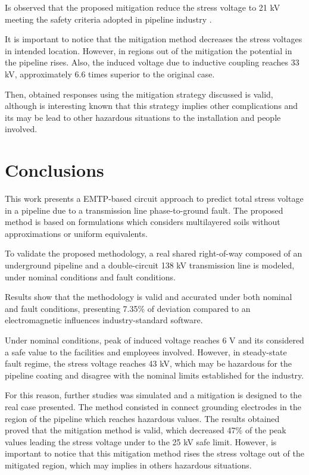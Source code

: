 \documentclass{IEEEtran4PSCC}
\begin{document}
Is observed that the proposed mitigation reduce the stress voltage to 21 kV meeting the safety criteria adopted in pipeline industry \cite{NACEInternational2007}. 

It is important to notice that the mitigation method decreases the stress voltages in intended location. However, in regions out of the mitigation the potential in the pipeline rises. Also, the induced voltage due to inductive coupling reaches 33 kV, approximately 6.6 times superior to the original case.

Then, obtained responses using the mitigation strategy discussed is valid, although is interesting known that this strategy implies other complications and its may be lead to other hazardous situations to the installation and people involved.

\section{Conclusions}

This work presents a EMTP-based circuit approach to predict total stress voltage in a pipeline due to a transmission line phase-to-ground fault. The proposed method is based on formulations which considers multilayered soils without approximations or uniform equivalents. 

To validate the proposed methodology, a real shared right-of-way composed of an underground pipeline and a double-circuit 138 kV transmission line is modeled, under nominal conditions and fault conditions. 

Results show that the methodology is valid and accurated under both nominal and fault conditions, presenting 7.35\% of deviation compared to an electromagnetic influences industry-standard software.

Under nominal conditions, peak of induced voltage reaches 6 V and its considered a safe value to the facilities and employees involved. However, in steady-state fault regime, the stress voltage reaches 43 kV, which may be hazardous for the pipeline coating and disagree with the nominal limits established for the industry. 

For this reason, further studies was simulated and a mitigation is designed to the real case presented. The method consisted in connect grounding electrodes in the region of the pipeline which reaches hazardous values. The results obtained proved that the mitigation method is valid, which decreased 47\% of the peak values leading the stress voltage under to the 25 kV safe limit. However, is important to notice that this mitigation method rises the stress voltage out of the mitigated region, which may implies in others hazardous situations.        


\nocite{*}

\end{document}
